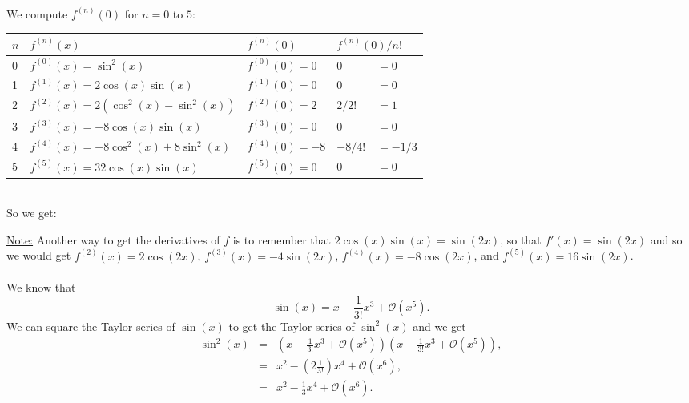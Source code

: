 \documentclass[pdftex,11pt]{article}
\begin{document}
\begin{enumerate}
\\

We compute $f^{(n)} (0)  $ for $n=0$ to $5$:

\begin{tabular}{|l|l|l|ll|}
\hline
$n$ & $ f^{(n)} (x)                             $ & $f^{(n)} (0)        $ & \multicolumn{2}{l|}{$f^{(n)} (0) / n! $} \\
\hline
0 & $ f^{(0)} (x) = \sin^2(x)                 $ & $f^{(0)} (0) =  0   $ & $0$    &$=0$\\
1 & $ f^{(1)} (x) = 2\cos(x)\sin(x)           $ & $f^{(1)} (0) =  0   $ & $0$    &$=0$\\
2 & $ f^{(2)} (x) = 2(\cos^2(x) - \sin^2(x))  $ & $f^{(2)} (0) =  2   $ & $2/2!$ &$=1$\\
3 & $ f^{(3)} (x) = -8\cos(x)\sin(x)          $ & $f^{(3)} (0) =  0   $ & $0$    &$=0$\\
4 & $ f^{(4)} (x) = -8\cos^2(x)+ 8\sin^2(x)   $ & $f^{(4)} (0) = -8   $ & $-8/4!$&$=-1/3$\\
5 & $ f^{(5)} (x) = 32\cos(x)\sin(x)          $ & $f^{(5)} (0) =  0   $ & $0$    &$=0$\\
\hline
\end{tabular}\\

So we get:
\begin{center}
\end{center}


\underline{Note:}
Another way to get the derivatives of $f$ is to remember that $2\cos(x)\sin(x) = \sin(2x)$, so that $f'(x) = \sin(2x) $
and so we would get
 $ f^{(2)} (x) = 2\cos(2x) $,
 $ f^{(3)} (x) = -4\sin(2x) $,
 $ f^{(4)} (x) = -8\cos(2x) $, and
 $ f^{(5)} (x) = 16\sin(2x) $.\\

\\

We know that 
$$  \sin(x) = x - \frac1{3!} x^3 + \mathcal{O}(x^5).$$
We can square the Taylor series of $\sin(x)$ to get the Taylor series of $\sin^2(x)$ and we get
\begin{eqnarray}
\nonumber  \sin^2(x) &=& \left( x - \frac1{3!} x^3 +\mathcal{O}(x^5) \right)\left( x - \frac1{3!} x^3  +\mathcal{O}(x^5) \right),\\
\nonumber            &=& x^2 - ( 2\frac1{3!} ) x^4 + \mathcal{O}(x^6),\\
\nonumber            &=& x^2 - \frac13  x^4 +  \mathcal{O}(x^6).
\end{eqnarray}


\end{enumerate}
\end{document}

